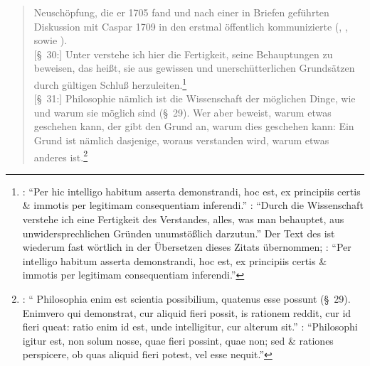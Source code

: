 \begin{quote}
{  Neuschöpfung, die er 1705 fand und nach einer in Briefen geführten Diskussion
  mit Caspar  1709 in den  erstmal
  öffentlich kommunizierte
  \mkbibparens{\cite[vgl.][\S~29]{Wolff:Discursuspraeliminarisdephilosophiaingenere1996},
  \cite[][\S~29]{Stiebritz:ErlaeuterungenderVernuenftigenGedanckenvondenKraefftendesmenschlichenVerstandesWolffs1977},
  sowie \cite[][xxvii]{Gawlick:Einleitung1996}}.}\\{}
  {[\S~30:]} Unter  verstehe ich hier die Fertigkeit, seine
  Behauptungen zu beweisen, das heißt, sie aus gewissen und unerschütterlichen Grundsätzen
  durch gültigen Schluß
  herzuleiten.\footnote{\Cite[][\S~30]{Wolff:Discursuspraeliminarisdephilosophiaingenere1996}:
  \enquote{Per  hic intelligo habitum asserta demonstrandi,
  hoc est, ex principiis certis {\&} immotis per
  legitimam consequentiam inferendi.} \cite[Vgl.][Vorbericht, \S~2]{Wolff:VernuenftigeGedankenvondenKraeftendesmenschlichenVerstandesundihremrichtigenGebraucheinErkenntnisderWahrheit1978}:
  \enquote{Durch die Wissenschaft verstehe ich eine Fertigkeit des
  Verstandes, alles, was man behauptet, aus unwidersprechlichen Gründen
  unumstößlich darzutun.} Der Text des  ist
  wiederum fast wörtlich in der Übersetzen dieses Zitats übernommen;
  \cite[vgl.][Prolegomena, \S 2]{Wolff:Cogitationesrationalesdeviribusintellectushumani1983}:
  \enquote{Per  intelligo habitum asserta demonstrandi, hoc
  est, ex principiis certis {\&} immotis per legitimam consequentiam
  inferendi.}}\\{}
  {[\S~31:]} 
  Philosophie nämlich ist die Wissenschaft der
  möglichen Dinge, wie und warum sie möglich sind (\S~29). {\punkt} Wer aber
  beweist, warum etwas geschehen kann, der gibt den Grund an, warum dies geschehen kann: Ein
  Grund ist nämlich dasjenige, woraus verstanden wird, warum etwas anderes
  ist.\footnote{\Cite[][\S~31]{Wolff:Discursuspraeliminarisdephilosophiaingenere1996}:
  \enquote{ Philosophia enim est scientia possibilium, quatenus esse
  possunt (\S~29). {\punkt} Enimvero qui demonstrat, cur aliquid fieri possit,
  is rationem reddit, cur id fieri queat: ratio enim id est, unde
  intelligitur, cur alterum sit.} \cite[Siehe
  auch][Praefatio]{Wolff:AerometriaeelementainquibusaliquotAerisviresacproprietatesjuxtamethodumGeometrarumdemonstrantur1981}:
  \enquote{Philosophi igitur est, non solum nosse, quae fieri possint, quae non;
  sed {\&} rationes perspicere, ob quas aliquid fieri potest, vel esse nequit.}}
\end{quote}
